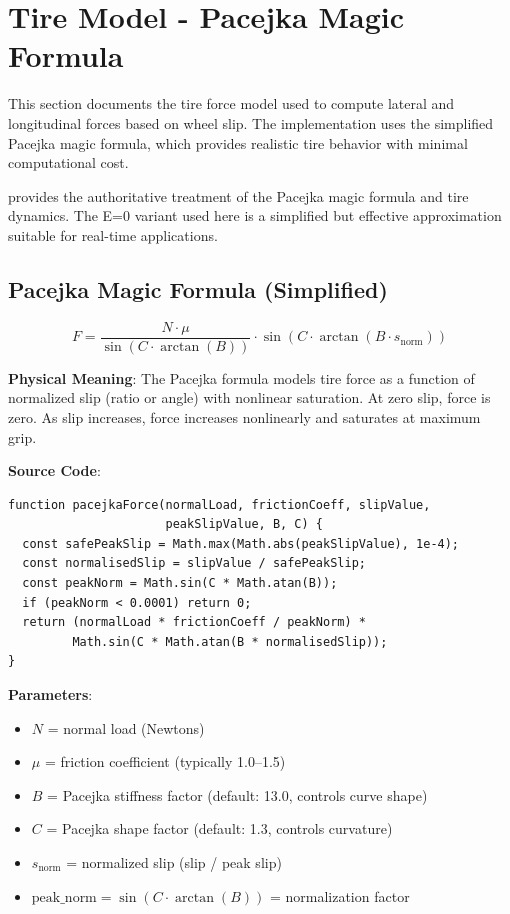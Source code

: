 \section{Tire Model - Pacejka Magic Formula}

\label{sec:tire-model}

This section documents the tire force model used to compute lateral and longitudinal forces based on wheel slip. The implementation uses the simplified Pacejka magic formula, which provides realistic tire behavior with minimal computational cost.

\cite{pacejka2005tire} provides the authoritative treatment of the Pacejka magic formula and tire dynamics. The E=0 variant used here is a simplified but effective approximation suitable for real-time applications.

\subsection{Pacejka Magic Formula (Simplified)}

\begin{equation}
  F = \frac{N \cdot \mu}{\sin(C \cdot \arctan(B))} \cdot \sin(C \cdot \arctan(B \cdot s_{\text{norm}}))
  \label{eq:pacejka-formula}
\end{equation}

\textbf{Physical Meaning}: The Pacejka formula models tire force as a function of normalized slip (ratio or angle) with nonlinear saturation. At zero slip, force is zero. As slip increases, force increases nonlinearly and saturates at maximum grip.

\textbf{Source Code}: 

\begin{lstlisting}[caption={Pacejka force computation}]
function pacejkaForce(normalLoad, frictionCoeff, slipValue,
                      peakSlipValue, B, C) {
  const safePeakSlip = Math.max(Math.abs(peakSlipValue), 1e-4);
  const normalisedSlip = slipValue / safePeakSlip;
  const peakNorm = Math.sin(C * Math.atan(B));
  if (peakNorm < 0.0001) return 0;
  return (normalLoad * frictionCoeff / peakNorm) *
         Math.sin(C * Math.atan(B * normalisedSlip));
}
\end{lstlisting}

\textbf{Parameters}:
\begin{itemize}
  \item $N$ = normal load (Newtons)
  \item $\mu$ = friction coefficient (typically 1.0–1.5)
  \item $B$ = Pacejka stiffness factor (default: 13.0, controls curve shape)
  \item $C$ = Pacejka shape factor (default: 1.3, controls curvature)
  \item $s_{\text{norm}}$ = normalized slip (slip / peak slip)
  \item $\text{peak\_norm} = \sin(C \cdot \arctan(B))$ = normalization factor
\end{itemize}

